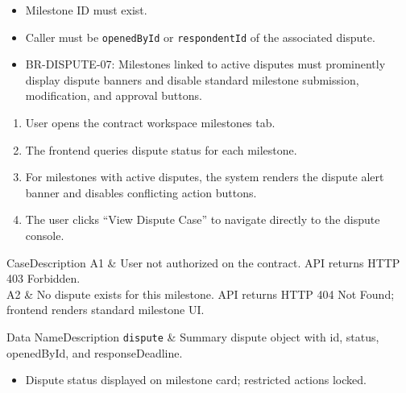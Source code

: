 \begin{itemize}[leftmargin=1.6em,topsep=3pt,itemsep=2pt,parsep=0pt,label=$\bullet$]
      \item Milestone ID must exist.
      \item Caller must be \texttt{openedById} or \texttt{respondentId} of the associated dispute.
\end{itemize}

\begin{itemize}[leftmargin=1.6em,topsep=3pt,itemsep=2pt,parsep=0pt,label=$\bullet$]\brrulelist
      \item BR-DISPUTE-07: Milestones linked to active disputes must prominently display dispute banners and disable standard milestone submission, modification, and approval buttons.
\end{itemize}

\begin{enumerate}[leftmargin=1.8em,topsep=3pt,itemsep=2pt,parsep=0pt]
      \item User opens the contract workspace milestones tab.
      \item The frontend queries dispute status for each milestone.
      \item For milestones with active disputes, the system renders the dispute alert banner and disables conflicting action buttons.
      \item The user clicks ``View Dispute Case'' to navigate directly to the dispute console.
\end{enumerate}

\begin{flowtable}{Case}{Description}
      A1 & User not authorized on the contract. API returns HTTP 403 Forbidden.\\ \hline
      A2 & No dispute exists for this milestone. API returns HTTP 404 Not Found; frontend renders standard milestone UI.\\ \hline
\end{flowtable}

\begin{specdatatable}{Data Name}{Description}
      \texttt{dispute} & Summary dispute object with id, status, openedById, and responseDeadline.\\ \hline
\end{specdatatable}

\begin{itemize}[leftmargin=1.6em,topsep=3pt,itemsep=2pt,parsep=0pt,label=$\bullet$]
      \item Dispute status displayed on milestone card; restricted actions locked.
\end{itemize}

